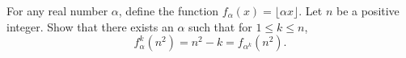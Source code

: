 For any real number $\alpha$, define the function $f_{\alpha}(x)
= \lfloor \alpha x \rfloor$. Let $n$ be a positive integer. Show that
there exists an $\alpha$ such that for $1 \leq k \leq n$,
\[
f_\alpha^k(n^2) = n^2 - k = f_{\alpha^k}(n^2).
\]
